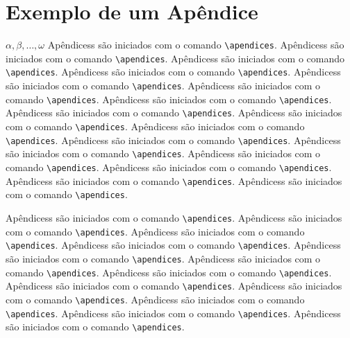 \chapter{Exemplo de um Apêndice}
\label{apend:1}
$ \alpha, \beta, \ldots, \omega $ \newline
Apêndicess são iniciados com o comando \verb|\apendices|.
Apêndicess são iniciados com o comando \verb|\apendices|.
Apêndicess são iniciados com o comando \verb|\apendices|.
Apêndicess são iniciados com o comando \verb|\apendices|.
Apêndicess são iniciados com o comando \verb|\apendices|.
Apêndicess são iniciados com o comando \verb|\apendices|.
Apêndicess são iniciados com o comando \verb|\apendices|.
Apêndicess são iniciados com o comando \verb|\apendices|.
Apêndicess são iniciados com o comando \verb|\apendices|.
Apêndicess são iniciados com o comando \verb|\apendices|.
Apêndicess são iniciados com o comando \verb|\apendices|.
Apêndicess são iniciados com o comando \verb|\apendices|.
Apêndicess são iniciados com o comando \verb|\apendices|.
Apêndicess são iniciados com o comando \verb|\apendices|.
Apêndicess são iniciados com o comando \verb|\apendices|.
Apêndicess são iniciados com o comando \verb|\apendices|.

Apêndicess são iniciados com o comando \verb|\apendices|.
Apêndicess são iniciados com o comando \verb|\apendices|.
Apêndicess são iniciados com o comando \verb|\apendices|.
Apêndicess são iniciados com o comando \verb|\apendices|.
Apêndicess são iniciados com o comando \verb|\apendices|.
Apêndicess são iniciados com o comando \verb|\apendices|.
Apêndicess são iniciados com o comando \verb|\apendices|.
Apêndicess são iniciados com o comando \verb|\apendices|.
Apêndicess são iniciados com o comando \verb|\apendices|.
Apêndicess são iniciados com o comando \verb|\apendices|.
Apêndicess são iniciados com o comando \verb|\apendices|.
Apêndicess são iniciados com o comando \verb|\apendices|.


